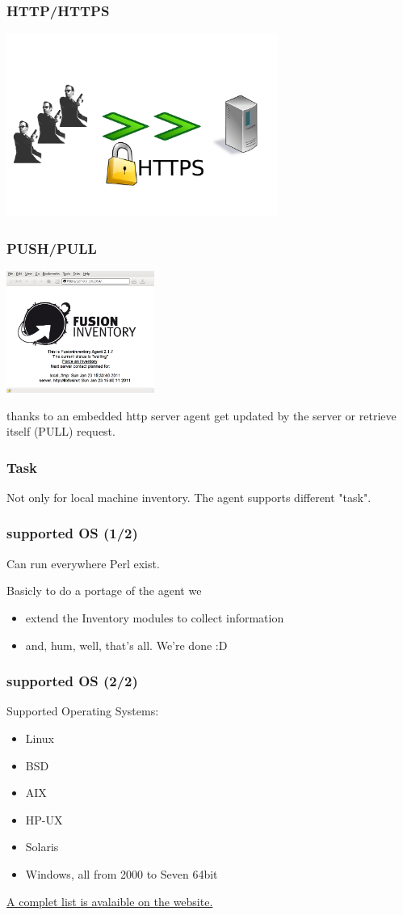 \begin{frame}
\frametitle{HTTP/HTTPS}
%
\includegraphics[height=6.0cm]{pics/https.pdf}
%
\end{frame}
\begin{frame}
\frametitle{PUSH/PULL}
\includegraphics[height=4.0cm]{pics/http-server.png}

thanks to an embedded http server agent get updated by the server or retrieve itself (PULL) request.
%
\end{frame}



\begin{frame}
\frametitle{Task}
%
Not only for local machine inventory. The agent supports different "task".
\end{frame}



\begin{frame}
\frametitle{supported OS (1/2)}
Can run everywhere Perl exist.

\pause
Basicly to do a portage of the agent we
\begin{itemize}
%
\item extend the Inventory modules to collect information
\item and, hum, well, that's all. We're done :D
%
\end{itemize}

\end{frame}
\begin{frame}
\frametitle{supported OS (2/2)}
Supported Operating Systems:
\begin{itemize}
%
\item Linux
\pause
\item BSD
\pause
\item AIX
\pause
\item HP-UX
\pause
\item Solaris
\pause
\item Windows, all from 2000 to Seven 64bit
%
\end{itemize}
\href{http://forge.fusioninventory.org/projects/fusioninventory-agent/wiki/Agent\_supportedplateforms}{A complet list is avalaible on the website.}
\end{frame}
 
